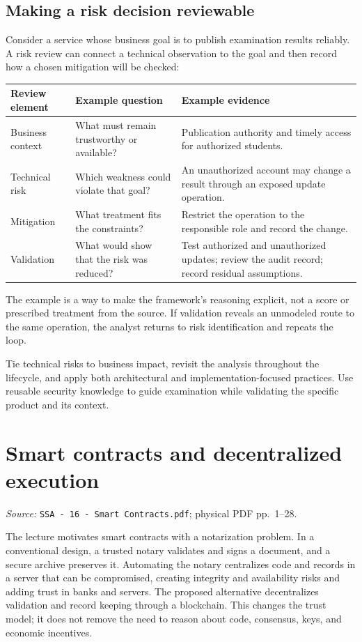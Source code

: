 \documentclass[11pt,a4paper]{article}
\newcommand{\currentmodule}{Contents}
\newcommand{\source}[2]{\textcolor{muted}{\small\textit{Source:} \nolinkurl{#1}; physical PDF pp.~#2.}\par\medskip}
\newcommand{\module}[2]{\par\Needspace{8\baselineskip}\gdef\currentmodule{#1}\section{#1}\label{#2}}
\numberwithin{figure}{section}
\begin{document}
\subsection{Making a risk decision reviewable}
Consider a service whose business goal is to publish examination results reliably. A risk review can connect a technical observation to the goal and then record how a chosen mitigation will be checked:
\begin{center}\small
\begin{tabularx}{\linewidth}{@{}p{27mm}YY@{}}\toprule
Review element & Example question & Example evidence\\\midrule
Business context & What must remain trustworthy or available? & Publication authority and timely access for authorized students.\\
Technical risk & Which weakness could violate that goal? & An unauthorized account may change a result through an exposed update operation.\\
Mitigation & What treatment fits the constraints? & Restrict the operation to the responsible role and record the change.\\
Validation & What would show that the risk was reduced? & Test authorized and unauthorized updates; review the audit record; record residual assumptions.\\\bottomrule
\end{tabularx}\end{center}
The example is a way to make the framework's reasoning explicit, not a score or prescribed treatment from the source. If validation reveals an unmodeled route to the same operation, the analyst returns to risk identification and repeats the loop.

\begin{takeaway}
Tie technical risks to business impact, revisit the analysis throughout the lifecycle, and apply both architectural and implementation-focused practices. Use reusable security knowledge to guide examination while validating the specific product and its context.
\end{takeaway}

\module{Smart contracts and decentralized execution}{sec:contracts}
\source{SSA - 16 - Smart Contracts.pdf}{1--28}
The lecture motivates smart contracts with a notarization problem. In a conventional design, a trusted notary validates and signs a document, and a secure archive preserves it. Automating the notary centralizes code and records in a server that can be compromised, creating integrity and availability risks and adding trust in banks and servers. The proposed alternative decentralizes validation and record keeping through a blockchain. This changes the trust model; it does not remove the need to reason about code, consensus, keys, and economic incentives.
\end{document}
